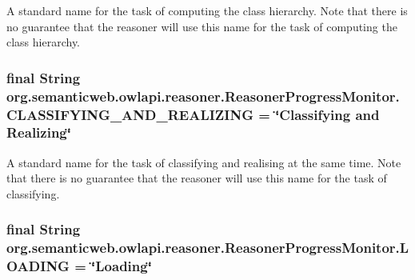 A standard name for the task of computing the class hierarchy. Note that there is no guarantee that the reasoner will use this name for the task of computing the class hierarchy. \hypertarget{interfaceorg_1_1semanticweb_1_1owlapi_1_1reasoner_1_1_reasoner_progress_monitor_ac2981bb79bf5542a4f9bfb199da50de1}{
\subsubsection[{C\-L\-A\-S\-S\-I\-F\-Y\-I\-N\-G\-\_\-\-A\-N\-D\-\_\-\-R\-E\-A\-L\-I\-Z\-I\-N\-G}]{\setlength{\rightskip}{0pt plus 5cm}final String org.\-semanticweb.\-owlapi.\-reasoner.\-Reasoner\-Progress\-Monitor.\-C\-L\-A\-S\-S\-I\-F\-Y\-I\-N\-G\-\_\-\-A\-N\-D\-\_\-\-R\-E\-A\-L\-I\-Z\-I\-N\-G = \char`\"{}Classifying and Realizing\char`\"{}\hspace{0.3cm}{\ttfamily [static]}}}\label{interfaceorg_1_1semanticweb_1_1owlapi_1_1reasoner_1_1_reasoner_progress_monitor_ac2981bb79bf5542a4f9bfb199da50de1}
A standard name for the task of classifying and realising at the same time. Note that there is no guarantee that the reasoner will use this name for the task of classifying. \hypertarget{interfaceorg_1_1semanticweb_1_1owlapi_1_1reasoner_1_1_reasoner_progress_monitor_a43cc26b4769cffdde5d48f1046478ff0}{
\subsubsection[{L\-O\-A\-D\-I\-N\-G}]{\setlength{\rightskip}{0pt plus 5cm}final String org.\-semanticweb.\-owlapi.\-reasoner.\-Reasoner\-Progress\-Monitor.\-L\-O\-A\-D\-I\-N\-G = \char`\"{}Loading\char`\"{}\hspace{0.3cm}{\ttfamily [static]}}}\label{interfaceorg_1_1semanticweb_1_1owlapi_1_1reasoner_1_1_reasoner_progress_monitor_a43cc26b4769cffdde5d48f1046478ff0}
